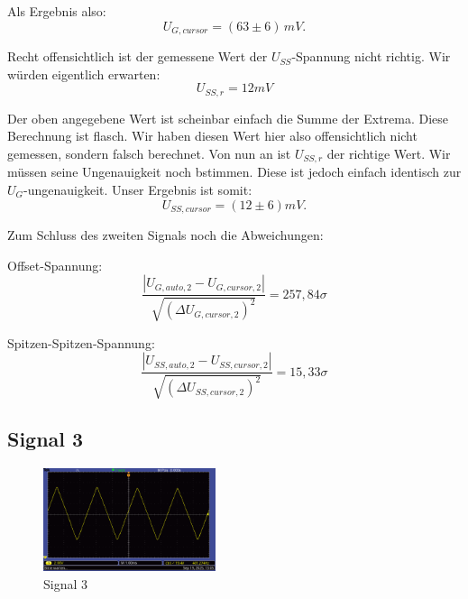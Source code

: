 Als Ergebnis also:
\begin{equation}
\boxed{
    U_{G,cursor} = (63 \pm 6) \, mV
}.
\end{equation}

Recht offensichtlich ist der gemessene Wert der $U_{SS}$-Spannung nicht richtig. Wir würden eigentlich erwarten:
\begin{equation}
    U_{SS,r} = 12 mV
\end{equation}

Der oben angegebene Wert ist scheinbar einfach die Summe der Extrema. Diese Berechnung ist flasch. Wir haben diesen Wert hier also offensichtlich nicht gemessen, sondern falsch berechnet. Von nun an ist $U_{SS,r}$ der richtige Wert.
Wir müssen seine Ungenauigkeit noch bstimmen. Diese ist jedoch einfach identisch zur $U_G$-ungenauigkeit. Unser Ergebnis ist somit:
\begin{equation}
    \boxed{
        U_{SS,cursor} = (12 \pm 6) mV
    }.
\end{equation}

Zum Schluss des zweiten Signals noch die Abweichungen:

Offset-Spannung:
\begin{equation}
    \frac{\left| U_{G,auto,2} - U_{G,cursor,2} \right|}{\sqrt{(\Delta U_{G,cursor,2})^2}} = 257,84\sigma
\end{equation}

Spitzen-Spitzen-Spannung:
\begin{equation}
    \frac{\left| U_{SS,auto,2} - U_{SS,cursor,2} \right|}{\sqrt{(\Delta U_{SS,cursor,2})^2}} = 15,33\sigma
\end{equation}

\newpage
\onecolumn
\twocolumn

\subsection*{Signal 3}
\begin{figure} [h!]
    \centering
        \includegraphics[width=0.45\textwidth]{img/25/Signale2/Signal3.pdf}
    \caption{Signal 3}
\end{figure}

